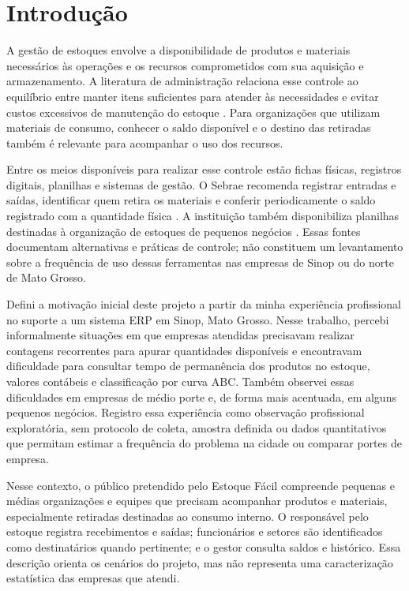 \chapter{Introdução}

A gestão de estoques envolve a disponibilidade de produtos e materiais necessários às operações e os recursos comprometidos com sua aquisição e armazenamento. A literatura de administração relaciona esse controle ao equilíbrio entre manter itens suficientes para atender às necessidades e evitar custos excessivos de manutenção do estoque \cite{OpenStaxEstoques}. Para organizações que utilizam materiais de consumo, conhecer o saldo disponível e o destino das retiradas também é relevante para acompanhar o uso dos recursos.

Entre os meios disponíveis para realizar esse controle estão fichas físicas, registros digitais, planilhas e sistemas de gestão. O Sebrae recomenda registrar entradas e saídas, identificar quem retira os materiais e conferir periodicamente o saldo registrado com a quantidade física \cite{SebraeControle2026}. A instituição também disponibiliza planilhas destinadas à organização de estoques de pequenos negócios \cite{SebraePlanilhas}. Essas fontes documentam alternativas e práticas de controle; não constituem um levantamento sobre a frequência de uso dessas ferramentas nas empresas de Sinop ou do norte de Mato Grosso.

Defini a motivação inicial deste projeto a partir da minha experiência profissional no suporte a um sistema ERP em Sinop, Mato Grosso. Nesse trabalho, percebi informalmente situações em que empresas atendidas precisavam realizar contagens recorrentes para apurar quantidades disponíveis e encontravam dificuldade para consultar tempo de permanência dos produtos no estoque, valores contábeis e classificação por curva ABC. Também observei essas dificuldades em empresas de médio porte e, de forma mais acentuada, em alguns pequenos negócios. Registro essa experiência como observação profissional exploratória, sem protocolo de coleta, amostra definida ou dados quantitativos que permitam estimar a frequência do problema na cidade ou comparar portes de empresa.

Nesse contexto, o público pretendido pelo Estoque Fácil compreende pequenas e médias organizações e equipes que precisam acompanhar produtos e materiais, especialmente retiradas destinadas ao consumo interno. O responsável pelo estoque registra recebimentos e saídas; funcionários e setores são identificados como destinatários quando pertinente; e o gestor consulta saldos e histórico. Essa descrição orienta os cenários do projeto, mas não representa uma caracterização estatística das empresas que atendi.

